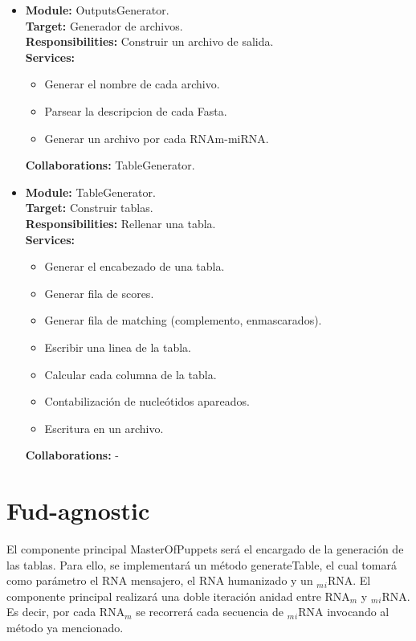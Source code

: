 \documentclass[12pt,a4paper,spanish]{article}
\begin{document}
\begin{itemize}
    \item \textbf{Module:} OutputsGenerator. \\
    \textbf{Target:} Generador de archivos. \\
    \textbf{Responsibilities:} Construir un archivo de salida. \\
    \textbf{Services:}
        \begin{itemize}
            \item Generar el nombre de cada archivo.
            \item Parsear la descripcion de cada Fasta.
            \item Generar un archivo por cada RNAm-miRNA.
        \end{itemize} 
    \textbf{Collaborations:} TableGenerator. \\

    \item \textbf{Module:} TableGenerator. \\
    \textbf{Target:} Construir tablas. \\
    \textbf{Responsibilities:} Rellenar una tabla. \\
    \textbf{Services:}
        \begin{itemize}
            \item Generar el encabezado de una tabla.
            \item Generar fila de scores.
            \item Generar fila de matching (complemento, enmascarados).
            \item Escribir una linea de la tabla.
            \item Calcular cada columna de la tabla.
            \item Contabilización de nucleótidos apareados.
            \item Escritura en un archivo.
        \end{itemize} 
    \textbf{Collaborations:} - \\
\end{itemize}

\section{Fud-agnostic}
\label{fud}

\par El componente principal \textsf{MasterOfPuppets} será el encargado de la generación de las tablas. Para ello, se implementará un método \textsf{generateTable}, el cual tomará como parámetro el RNA mensajero, el RNA humanizado y un $_m$$_i$RNA. El componente principal realizará una doble iteración anidad entre RNA$_m$ y $_m$$_i$RNA. Es decir, por cada RNA$_m$ se recorrerá cada secuencia de $_m$$_i$RNA invocando al método ya mencionado.
\end{document}
